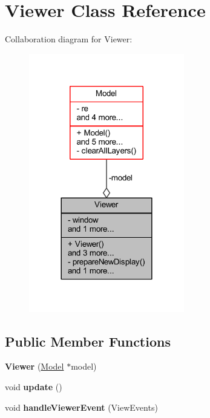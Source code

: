 \hypertarget{class_viewer}{}\section{Viewer Class Reference}
\label{class_viewer}


Collaboration diagram for Viewer\+:\nopagebreak
\begin{figure}[H]
\begin{center}
\leavevmode
\includegraphics[width=192pt]{class_viewer__coll__graph}
\end{center}
\end{figure}
\subsection*{Public Member Functions}
\begin{DoxyCompactItemize}
\item 
\mbox{\label{class_viewer_a767681a73f280357e6401f469c17ca4a}} 
{\bfseries Viewer} (\hyperlink{class_model}{Model} $\ast$model)
\item 
\mbox{\label{class_viewer_a7122ce13ef7b396ac8b7e471e4c82693}} 
void {\bfseries update} ()
\item 
\mbox{\label{class_viewer_aac14898275de71b0f0d43c11214852be}} 
void {\bfseries handle\+Viewer\+Event} (View\+Events)
\end{DoxyCompactItemize}
